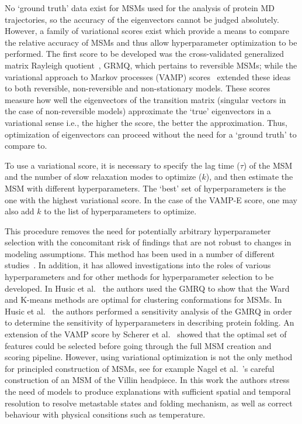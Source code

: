 \documentclass[journal=jacsat,manuscript=article]{achemso}
\begin{document}
No `ground truth' data exist for MSMs used for the analysis of protein MD trajectories, so the accuracy of the eigenvectors cannot be judged absolutely. However, a family of variational scores exist which provide a means to compare the relative accuracy of MSMs and thus allow hyperparameter optimization to be performed. The first score to be developed was the cross-validated generalized matrix Rayleigh quotient~\cite{mcgibbonVariationalCrossvalidationSlow2015}, GRMQ, which pertains to reversible MSMs; while the variational approach to Markov processes (VAMP) scores~\cite{wuVariationalApproachLearning2020c,scherer_variational_2019} extended these ideas to both reversible, non-reversible and non-stationary models. These scores measure how well the eigenvectors of the transition matrix (singular vectors in the case of non-reversible models) approximate the `true' eigenvectors in a variational sense i.e., the higher the score, the better the approximation. Thus, optimization of eigenvectors can proceed without the need for a `ground truth' to compare to.   

To use a variational score, it is necessary to specify the lag time ($\tau$) of the MSM and the number of slow relaxation modes to optimize ($k$), and then estimate the MSM with different hyperparameters. The `best' set of hyperparameters is the one with the highest variational score. In the case of the VAMP-E score, one may also add $k$ to the list of hyperparameters to optimize. 

This procedure removes the need for potentially arbitrary hyperparameter selection with the concomitant risk of findings that are not robust to changes in modeling assumptions. This method has been used in a number of different studies~\cite{A_Minimum_2018, Adaptive_M2020, High-Resol2019, Maximizing2018, Modeling_t2017, Optimized_2016, Quantitati2018, VAMPnets_f2018, Variationa2018, Ward_Clust2017}. In addition, it has allowed investigations into the roles of various hyperparameters and for other methods for hyperparameter selection to be developed. In Husic et al.~
\cite{Ward_Clust2017} the authors used the GMRQ to show that the Ward and K-means methods are optimal for clustering conformations for MSMs. In Husic et al.~\cite{Optimized_2016} the authors performed a sensitivity analysis of the GMRQ  in order to determine the sensitivity of hyperparameters in describing protein folding.  An extension of the VAMP score by Scherer et al.~\cite{scherer_variational_2019} showed that the optimal set of features could be selected before going through the full MSM creation and scoring pipeline. However, using variational optimization is not the only method for principled construction of MSMs, see for example Nagel et al.~\cite{nagelSelectingFeaturesMarkov2023, nagelBenchmarkMarkovState2023}'s careful construction of an MSM of the Villin headpiece. In this work the authors stress the need of models to produce explanations with sufficient spatial and temporal resolution to resolve metastable states and folding mechanism, as well as correct behaviour with physical consitions such as temperature. 
\end{document}
